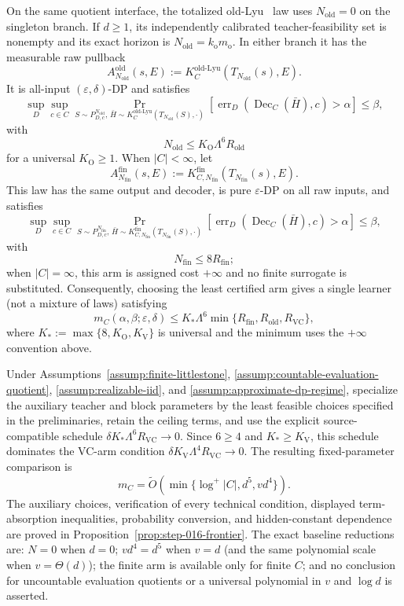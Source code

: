 \begin{theorem}
On the same quotient interface, the totalized old-Lyu~\citep{lyu2025} law
uses $N_{\mathrm{old}}=0$ on the singleton branch. If $d\ge1$, its
independently calibrated teacher-feasibility set is nonempty and its exact
horizon is $N_{\mathrm{old}}=k_{\mathrm o}m_{\mathrm o}$. In either branch
it has the measurable raw pullback
\[
 A_{N_{\mathrm{old}}}^{\mathrm{old}}(s,E)
 :=K_C^{\mathrm{old\text{-}Lyu}}(T_{N_{\mathrm{old}}}(s),E).
\]
It is all-input $(\varepsilon,\delta)$-DP and satisfies
\[
 \sup_D\sup_{c\in C}
 \Pr_{S\sim P_{D,c}^{N_{\mathrm{old}}},\,
 \bar H\sim K_C^{\mathrm{old\text{-}Lyu}}
 (T_{N_{\mathrm{old}}}(S),\cdot)}
 \left[\operatorname{err}_D(\operatorname{Dec}_C(\bar H),c)>\alpha\right]
 \le\beta,
\]
with
\[
 N_{\mathrm{old}}\le K_{\mathrm O}\Lambda^{6}R_{\mathrm{old}}
\]
for a universal $K_{\mathrm O}\ge1$. When $|C|<\infty$, let
\[
 A_{N_{\mathrm{fin}}}^{\mathrm{fin}}(s,E)
 :=K_{C,N_{\mathrm{fin}}}^{\mathrm{fin}}
 (T_{N_{\mathrm{fin}}}(s),E).
\]
This law has the same output and decoder, is pure $\varepsilon$-DP on all
raw inputs, and satisfies
\[
 \sup_D\sup_{c\in C}
 \Pr_{S\sim P_{D,c}^{N_{\mathrm{fin}}},\,
 \bar H\sim K_{C,N_{\mathrm{fin}}}^{\mathrm{fin}}
 (T_{N_{\mathrm{fin}}}(S),\cdot)}
 \left[\operatorname{err}_D(\operatorname{Dec}_C(\bar H),c)>\alpha\right]
 \le\beta,
\]
with
\[
 N_{\mathrm{fin}}\le 8R_{\mathrm{fin}};
\]
when $|C|=\infty$, this arm is assigned cost $+\infty$ and no finite
surrogate is substituted.  Consequently, choosing the least certified arm
gives a single learner (not a mixture of laws) satisfying
\[
 m_C(\alpha,\beta;\varepsilon,\delta)
 \le K_*\Lambda^{6}\min\{R_{\mathrm{fin}},R_{\mathrm{old}},R_{\mathrm{VC}}\},
\]
where $K_*:=\max\{8,K_{\mathrm O},K_{\mathrm V}\}$ is universal and the minimum uses the
$+\infty$ convention above.
\end{theorem}

\begin{corollary}\label{cor:frontier}
Under Assumptions~\ref{assump:finite-littlestone},
\ref{assump:countable-evaluation-quotient},
\ref{assump:realizable-iid}, and
\ref{assump:approximate-dp-regime}, specialize the auxiliary teacher and block
parameters by the least feasible choices specified in the preliminaries,
retain the ceiling terms, and use the explicit source-compatible schedule
$\delta K_*\Lambda^{6}R_{\mathrm{VC}}\to0$.  Since $6\ge4$ and
$K_*\ge K_{\mathrm V}$, this schedule dominates the VC-arm condition
$\delta K_{\mathrm V}\Lambda^{4}R_{\mathrm{VC}}\to0$.  The resulting fixed-parameter
comparison is
\[
 m_C=\widetilde O\!\left(\min\{\log^+|C|,d^5,vd^4\}\right).
\]
The auxiliary choices, verification of every technical condition, displayed
term-absorption inequalities, probability conversion, and hidden-constant
dependence are proved in Proposition~\ref{prop:step-016-frontier}.
The exact baseline reductions are: $N=0$ when $d=0$; $vd^4=d^5$ when
$v=d$ (and the same polynomial scale when $v=\Theta(d)$); the finite arm is
available only for finite $C$; and no conclusion for uncountable evaluation
quotients or a universal polynomial in $v$ and $\log d$ is asserted.
\end{corollary}
